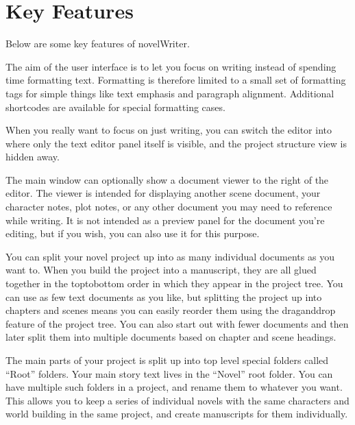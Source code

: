 \documentclass[a4paper,11pt,english]{sphinxmanual}
\begin{document}
\section{Key Features}
\label{\detokenize{int_introduction:key-features}}\label{\detokenize{int_introduction:a-intro-features}}
\sphinxAtStartPar
Below are some key features of novelWriter.
\begin{description}
\sphinxAtStartPar
The aim of the user interface is to let you focus on writing instead of spending time formatting
text. Formatting is therefore limited to a small set of formatting tags for simple things like
text emphasis and paragraph alignment. Additional shortcodes are available for special
formatting cases.

\sphinxAtStartPar
When you really want to focus on just writing, you can switch the editor into 
where only the text editor panel itself is visible, and the project structure view is hidden
away.

\sphinxAtStartPar
The main window can optionally show a document viewer to the right of the editor. The viewer
is intended for displaying another scene document, your character notes, plot notes, or any
other document you may need to reference while writing. It is not intended as a preview panel
for the document you’re editing, but if you wish, you can also use it for this purpose.

\sphinxAtStartPar
You can split your novel project up into as many individual documents as you want to. When you
build the project into a manuscript, they are all glued together in the top\sphinxhyphen{}to\sphinxhyphen{}bottom order in
which they appear in the project tree. You can use as few text documents as you like, but
splitting the project up into chapters and scenes means you can easily reorder them using the
drag\sphinxhyphen{}and\sphinxhyphen{}drop feature of the project tree. You can also start out with fewer documents and then
later split them into multiple documents based on chapter and scene headings.

\sphinxAtStartPar
The main parts of your project is split up into top level special folders called “Root” folders.
Your main story text lives in the “Novel” root folder. You can have multiple such folders in a
project, and rename them to whatever you want. This allows you to keep a series of individual
novels with the same characters and world building in the same project, and create manuscripts
for them individually.


\end{description}
\end{document}
